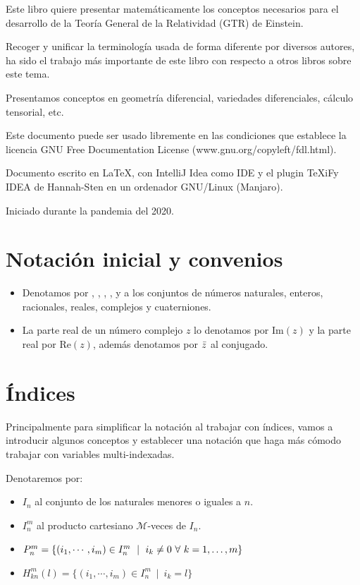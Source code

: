 Este libro quiere presentar matemáticamente los conceptos necesarios para el desarrollo de la Teoría General de la
Relatividad (GTR) de Einstein.

Recoger y unificar la terminología usada de forma diferente por diversos autores, ha sido el trabajo más importante
de este libro con respecto a otros libros sobre este tema.

Presentamos conceptos en geometría diferencial, variedades diferenciales, cálculo tensorial, etc.

Este documento puede ser usado libremente en las condiciones que establece la licencia GNU Free Documentation License
(www.gnu.org/copyleft/fdl.html).

Documento escrito en \LaTeX, con IntelliJ Idea como IDE y el plugin TeXiFy IDEA
de Hannah-Sten en un ordenador GNU/Linux (Manjaro).

Iniciado durante la pandemia del 2020.


\section{Notaci\'on inicial y convenios}\label{sec:notacion-inicial-convenios}
\begin{itemize}
  \item Denotamos por , , , ,  y  a los
  conjuntos de números naturales,
  enteros,
  racionales, reales, complejos y cuaterniones.
  \item La parte real de un número complejo $z$ lo denotamos por $\text{Im}(z)$ y la parte real por $\text{Re}(z)$,
  además
  denotamos por $\bar{z}$ al conjugado.
\end{itemize}

\section{\'Indices}\label{sec:indices}
Principalmente para simplificar la notación al trabajar con índices, vamos
a introducir algunos conceptos y establecer una notación que haga más cómodo
trabajar con variables multi-indexadas.

\begin{notation}
  Denotaremos por:
  \begin{itemize}
    \item $I_n$ al conjunto de los naturales menores o iguales a $n$.
    \item $I_n^m$ al producto cartesiano $\mathcal{M}$-veces de $I_n$.
    \item $P_n^m=\{(i_1,\cdots,i_m)\in I_n^m\ \mid \ i_k\neq 0\ \forall\ \indexdots{k}{1}{m}\}$
    \item $H_{kn}^m(l)=\{(i_1,\cdots,i_m)\in I_n^m\ \mid \ i_k=l\}$
  \end{itemize}
\end{notation}

